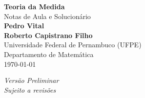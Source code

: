 \begin{titlepage}
    \centering
    \vspace*{2cm}  %

    \Huge{\textbf{Teoria da Medida}}\\[1.5cm]
    
    \Large{Notas de Aula e Solucionário}\\[1cm]
    
    \Large{\textbf{Pedro Vital\\Roberto Capistrano Filho}}\\[0.5cm]
    
    \large{Universidade Federal de Pernambuco (UFPE)}\\[0.5cm]
    
    \large{Departamento de Matemática}\\[1.5cm]
    
    \large{\today}
    
    \vfill
    
    \large{\textit{Versão Preliminar}}\\
    \large{\textit{Sujeito a revisões}}
    
\end{titlepage}
